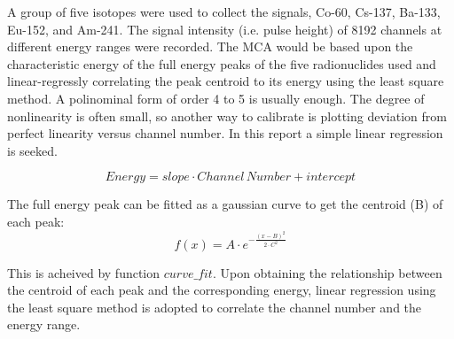 A group of five isotopes were used to collect the signals, Co-60, Cs-137, Ba-133, Eu-152, and Am-241. The signal intensity (i.e. pulse height) of 8192 channels at different energy ranges were recorded. The MCA would be based upon the characteristic energy of the full energy peaks of the five radionuclides used and linear-regressly correlating the peak centroid to its energy using the least square method. A polinominal form of order 4 to 5 is usually enough. The degree of nonlinearity is often small, so another way to calibrate is plotting deviation from perfect linearity versus channel number. In this report a simple linear regression is seeked.


\[Energy=slope\cdot Channel\,Number + intercept\]

The full energy peak can be fitted as a gaussian curve to get the centroid (B) of each peak:
\[f\left( x \right) = A \cdot {e^{ - \frac{{{{\left( {x - B} \right)}^2}}}{{2 \cdot {C^2}}}}}\]

This is acheived by function $curve\_fit$. Upon obtaining the relationship between the centroid of each peak and the corresponding energy, linear regression using the least square method is adopted to correlate the channel number and the energy range.


